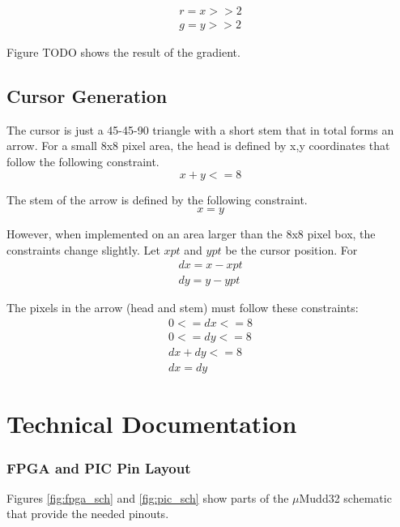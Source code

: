 \documentclass[11pt]{article}
\begin{document}
\begin{eqnarray*}
r = x >> 2 \\
g = y >> 2
\end{eqnarray*}
 
Figure TODO shows the result of the gradient.

\subsection{Cursor Generation}

The cursor is just a 45-45-90 triangle with a short stem that in total forms an arrow. For a small 8x8 pixel area, the head is defined by x,y coordinates that follow the following constraint.
\begin{equation*}
x + y <= 8
\end{equation*}

The stem of the arrow is defined by the following constraint.
\begin{equation*}
x = y
\end{equation*}

However, when implemented on an area larger than the 8x8 pixel box, the constraints change slightly. Let $xpt$ and $ypt$ be the cursor position. For
\begin{eqnarray*}
	dx = x-xpt	\\
	dy = y-ypt
\end{eqnarray*}

The pixels in the arrow (head and stem) must follow these constraints:
\begin{eqnarray*}
	0 <= dx <= 8\\
	0 <= dy <= 8\\
	dx + dy <= 8\\
	dx = dy
\end{eqnarray*} 

\clearpage

\section{Technical Documentation}

\subsubsection{FPGA and PIC Pin Layout} 

Figures \ref{fig:fpga_sch} and \ref{fig:pic_sch} show parts of the $\mu$Mudd32 schematic that provide the needed pinouts.   
\end{document}
